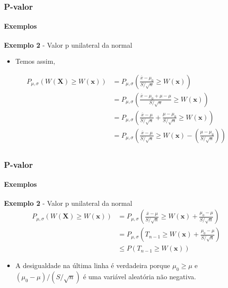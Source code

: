 \begin{frame}[c]
\frametitle{P-valor} 
\framesubtitle{Exemplos}
\begin{exampleblock}{\textbf{Exemplo 2} - Valor p unilateral da normal} %
\begin{itemize}
    \item Temos assim,
\end{itemize}
\begin{align*}
P_{\mu,\sigma}(W(\textbf{X}) \geq W(\textbf{x})) &=P_{\mu,\sigma}\left(\frac{\overline{x}-\mu_{0}}{S/\sqrt{n}} \geq W(\textbf{x})\right)\\
&=P_{\mu,\sigma}\left(\frac{\overline{x}-\mu_{0} + \mu - \mu}{S/\sqrt{n}} \geq W(\textbf{x})\right)\\
&=P_{\mu,\sigma}\left(\frac{\overline{x}-\mu}{S/\sqrt{n}} + \frac{\mu-\mu_0}{S/\sqrt{n}}\geq W(\textbf{x})\right)\\
&=P_{\mu,\sigma}\left(\frac{\overline{x}-\mu}{S/\sqrt{n}} \geq W(\textbf{x}) - \left( \frac{\mu-\mu_0}{S/\sqrt{n}}\right)\right)\\
\end{align*}
\end{exampleblock}
\end{frame}

\begin{frame}[c]
\frametitle{P-valor} 
\framesubtitle{Exemplos}
\begin{exampleblock}{\textbf{Exemplo 2} - Valor p unilateral da normal} %
\begin{align*}
P_{\mu,\sigma}(W(\textbf{X}) \geq W(\textbf{x})) 
&=P_{\mu,\sigma}\left(\frac{\overline{x}-\mu}{S/\sqrt{n}} \geq W(\textbf{x}) + \frac{\mu_{0}-\mu}{S/\sqrt{n}}\right)\\
&=P_{\mu,\sigma}\left(T_{n-1} \geq W(\textbf{x})+\frac{\mu_{0}-\mu}{S/\sqrt{n}}\right)\\
&\leq P(T_{n-1} \geq W(\textbf{x}))
\end{align*}
\begin{itemize}
    \item A desigualdade na última linha é verdadeira porque $\mu_{0} \geq \mu$ e $(\mu_{0}-\mu)/(S/\sqrt{n})$ é uma variável aleatória não negativa.
\end{itemize}
\end{exampleblock}
\end{frame}

